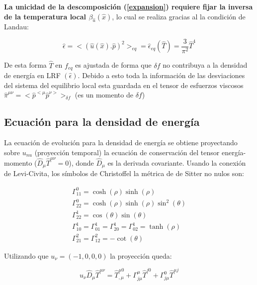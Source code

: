 \documentclass[11pt,a4paper]{article}
\begin{document}
\textbf{La unicidad de la descomposición (\ref{expansion}) requiere fijar la inversa de la temperatura local $\beta_{\hat{u}}(\hat{x})$}, lo cual se realiza gracias al la condición de Landau:

\begin{equation}
\hat{\epsilon}=<(\hat{u}(\hat{x}).\hat{p})^2>_{eq}=\hat{\epsilon}_{eq}({\hat{T}})=\frac{3}{\pi^2}{\hat{T}}^4
\end{equation}

De esta forma ${\hat{T}}$ en $f_{eq}$ es ajustada de forma que ${\delta}f$ no contribuya  a la densidad de energía en LRF $(\hat{\epsilon})$. Debido a esto toda la información de las desviaciones del sistema del equilibrio local esta guardada en el tensor de esfuerzos viscosos $\hat{\pi}^{{\mu}{\nu}}=<\hat{p}^{<\mu}\hat{p}^{\nu>}>_{{\delta}f}$ (es un momento de ${{\delta}f}$)


\subsection{Ecuación para la densidad de energía}
La ecuación de evolución para la densidad de energía se obtiene proyectando sobre $u_{nu}$ (proyección temporal) la ecuación de conservación del tensor energía-momento ($\hat{D}_{\mu}\hat{T}^{{\mu}{\nu}}=0$), donde $\hat{D}_{\mu}$ es la derivada covariante.
Usando la conexión de Levi-Civita, los símbolos de Christoffel la métrica de de Sitter no nulos son:

\begin{subequations}
\begin{align}
\label{011}
\Gamma^{0}_{{1}{1}}=\cosh(\rho)\sinh(\rho)\\
\label{022}
\Gamma^{0}_{{2}{2}}=\cosh(\rho)\sinh(\rho)\sin^2(\theta)\\
\Gamma^{1}_{{2}{2}}=\cos(\theta)\sin(\theta)\\
\Gamma^{1}_{{1}{0}}=\Gamma^{1}_{{0}{1}}=\Gamma^{1}_{{2}{0}}=\Gamma^{1}_{{0}{2}}=\tanh(\rho)\\
\Gamma^{2}_{{2}{1}}=\Gamma^{2}_{{1}{2}}=-\cot(\theta)
\end{align}
\label{christoffel}
\end{subequations}

Utilizando que $u_{\nu}=(-1,0,0,0)$ la proyección queda:

\begin{equation}
u_{\nu}\hat{D}_{\mu}\hat{T}^{{\mu}{\nu}}= \hat{T}^{{\mu}{0}}_{,\mu} +\Gamma^{\mu}_{{j}{\mu}}\hat{T}^{{j}{0}}+\Gamma^{0}_{{j}{\mu}}\hat{T}^{{\mu}{j}}
\end{equation}
\end{document}
